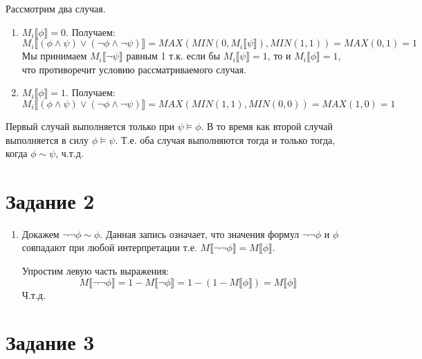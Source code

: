 \documentclass{article}
\begin{document}
\begin{enumerate}
        Рассмотрим два случая.
        \begin{enumerate}
            \item
                \(M_i\llbracket \phi \rrbracket = 0\). Получаем:
                \[
                    M_i\llbracket (\phi \land \psi) \lor (\neg \phi \land \neg \psi) \rrbracket
                    = MAX(MIN(0, M_i\llbracket\psi\rrbracket), MIN(1, 1))
                    = MAX(0, 1)
                    = 1
                \]
                Мы принимаем \(M_i\llbracket\neg\psi\rrbracket\) равным 1 т.к. если бы \(M_i\llbracket\psi\rrbracket = 1\), то и \(M_i\llbracket\phi\rrbracket = 1\), что противоречит условию рассматриваемого случая.
            \item
                \(M_i\llbracket \phi \rrbracket = 1\). Получаем:
                \[
                    M_i\llbracket (\phi \land \psi) \lor (\neg \phi \land \neg \psi) \rrbracket
                    = MAX(MIN(1, 1), MIN(0, 0))
                    = MAX(1, 0)
                    = 1
                \]
        \end{enumerate}

        Первый случай выполняется только при \(\psi \models \phi\).
        В то время как второй случай выполняется в силу \(\phi \models \psi\).
        Т.е. оба случая выполняются тогда и только тогда, когда \(\phi \sim \psi\), ч.т.д.
\end{enumerate}

\section*{Задание 2}
\begin{enumerate}
    \item
        Докажем \(\neg \neg \phi \sim \phi\). Данная запись означает, что значения формул \(\neg \neg \phi\) и \(\phi\) совпадают при любой интерпретации т.е. \(M\llbracket \neg \neg \phi\rrbracket = M\llbracket\phi\rrbracket\).

        Упростим левую часть выражения:
        \[
            M\llbracket\neg \neg \phi \rrbracket
            = 1 - M\llbracket \neg \phi \rrbracket
            = 1 - (1 - M\llbracket\phi\rrbracket)
            = M\llbracket\phi\rrbracket
        \]
        Ч.т.д.
\end{enumerate}

\section*{Задание 3}
\end{document}
